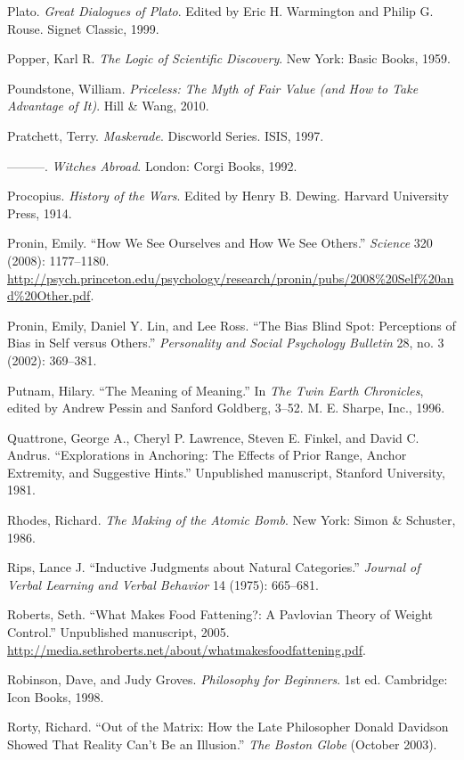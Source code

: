 \documentclass[letterpaper]{book}
\begin{document}
{
 Plato. \textit{Great Dialogues of Plato}. Edited by Eric H.
Warmington and Philip G. Rouse. Signet Classic, 1999.}

{
 Popper, Karl R. \textit{The Logic of Scientific Discovery}. New
York: Basic Books, 1959.}

{
 Poundstone, William. \textit{Priceless: The Myth of Fair Value
(and How to Take Advantage of It)}. Hill \& Wang, 2010.}

{
 Pratchett, Terry. \textit{Maskerade}. Discworld Series. ISIS,
1997.}

{
 {}---{}---{}---. \textit{Witches Abroad}. London: Corgi Books,
1992.}

{
 Procopius. \textit{History of the Wars}. Edited by Henry B.
Dewing. Harvard University Press, 1914.}

{
 Pronin, Emily. ``How We See Ourselves and How We
See Others.'' \textit{Science} 320 (2008):
1177--1180.
\url{http://psych.princeton.edu/psychology/research/pronin/pubs/2008\%20Self\%20and\%20Other.pdf}.}

{
 Pronin, Emily, Daniel Y. Lin, and Lee Ross. ``The
Bias Blind Spot: Perceptions of Bias in Self versus
Others.'' \textit{Personality and Social Psychology
Bulletin} 28, no. 3 (2002): 369--381.}

{
 Putnam, Hilary. ``The Meaning of
Meaning.'' In \textit{The Twin Earth Chronicles},
edited by Andrew Pessin and Sanford Goldberg, 3--52. M. E. Sharpe,
Inc., 1996.}

{
 Quattrone, George A., Cheryl P. Lawrence, Steven E. Finkel, and
David C. Andrus. ``Explorations in Anchoring: The
Effects of Prior Range, Anchor Extremity, and Suggestive
Hints.'' Unpublished manuscript, Stanford University,
1981.}

{
 Rhodes, Richard. \textit{The Making of the Atomic Bomb}. New York:
Simon \& Schuster, 1986.}

{
 Rips, Lance J. ``Inductive Judgments about
Natural Categories.'' \textit{Journal of Verbal
Learning and Verbal Behavior} 14 (1975): 665--681.}

{
 Roberts, Seth. ``What Makes Food Fattening?: A
Pavlovian Theory of Weight Control.'' Unpublished
manuscript, 2005.
\url{http://media.sethroberts.net/about/whatmakesfoodfattening.pdf}.}

{
 Robinson, Dave, and Judy Groves. \textit{Philosophy for
Beginners}. 1st ed. Cambridge: Icon Books, 1998.}

{
 Rorty, Richard. ``Out of the Matrix: How the Late
Philosopher Donald Davidson Showed That Reality Can't
Be an Illusion.'' \textit{The Boston Globe} (October
2003).}
\end{document}
